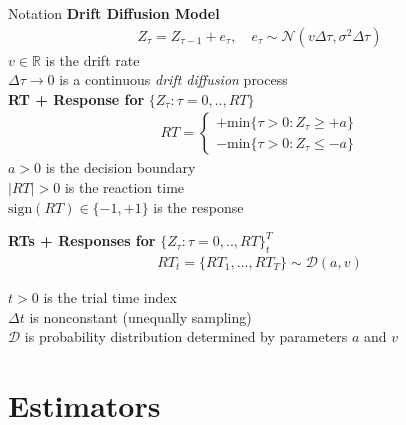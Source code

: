 \documentclass[8pt]{beamer}
\begin{document}
\begin{frame}{Notation}
\textbf{Drift Diffusion Model}
\begin{align}
    Z_\tau = Z_{\tau-1} + e_\tau, \quad e_\tau \sim \mathcal{N}(v\Delta \tau, \sigma^2 \Delta \tau)
\end{align}
$v \in \mathbb{R}$ is the drift rate\\
$\Delta \tau \to 0$ is a continuous \textit{drift diffusion} process\\

\vspace{.25cm}
\textbf{RT + Response for} $\{Z_\tau: \tau=0, .., RT\}$
\begin{align}
    RT = \begin{cases}
        + \text{min}\{\tau>0: Z_\tau \ge +a\}\\
        - \text{min}\{\tau>0: Z_\tau \le -a\}
        \end{cases}
\end{align}
$a>0$ is the decision boundary\\
$|RT|> 0$ is the reaction time\\
$\text{sign}(RT) \in \{-1, +1\}$ is the response

\vspace{.25cm}
\textbf{RTs + Responses for} $\{Z_\tau: \tau=0, .., RT\}_t^T$
\begin{align}
    RT_t = \{RT_1, ..., RT_T\} \sim \mathcal{D}(a, v)
\end{align}

$t > 0$ is the trial time index\\
$\Delta t$ is nonconstant (unequally sampling)\\
$\mathcal{D}$ is probability distribution determined by parameters $a$ and $v$
\end{frame}

\section{Estimators}
\end{document}
